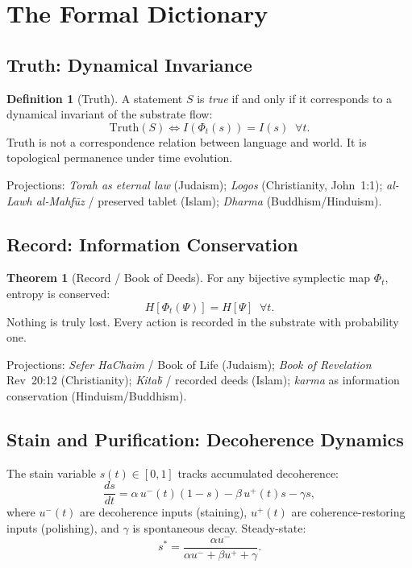 \documentclass[12pt,oneside]{book}
\theoremstyle{definition}
\newtheorem{definition}{Definition}[chapter]
\newtheorem{theorem}{Theorem}[chapter]
\begin{document}
\section{The Formal Dictionary}

\subsection{Truth: Dynamical Invariance}

\begin{definition}[Truth]
  A statement $S$ is \emph{true} if and only if it corresponds to a dynamical
  invariant of the substrate flow:
  \begin{equation}
    \mathrm{Truth}(S) \iff I(\Phi_t(s)) = I(s) \;\;\forall t.
  \end{equation}
  Truth is not a correspondence relation between language and world. It is
  topological permanence under time evolution.
\end{definition}

\noindent Projections: \textit{Torah as eternal law} (Judaism); \textit{Logos}
(Christianity, John~1:1); \textit{al-Lawh al-Mahf\={u}z} / preserved tablet
(Islam); \textit{Dharma} (Buddhism/Hinduism).

\subsection{Record: Information Conservation}

\begin{theorem}[Record / Book of Deeds]
  For any bijective symplectic map $\Phi_t$, entropy is conserved:
  \begin{equation}
    H[\Phi_t(\Psi)] = H[\Psi] \;\;\forall t.
  \end{equation}
  Nothing is truly lost. Every action is recorded in the substrate with probability one.
\end{theorem}

\noindent Projections: \textit{Sefer HaChaim} / Book of Life (Judaism);
\textit{Book of Revelation} Rev~20:12 (Christianity); \textit{Kita\={b}} /
recorded deeds (Islam); \textit{karma} as information conservation (Hinduism/Buddhism).

\subsection{Stain and Purification: Decoherence Dynamics}

The stain variable $s(t) \in [0,1]$ tracks accumulated decoherence:
\begin{equation}
  \label{eq:stain}
  \frac{ds}{dt} = \alpha\,u^-(t)(1-s) - \beta\,u^+(t)s - \gamma s,
\end{equation}
where $u^-(t)$ are decoherence inputs (staining), $u^+(t)$ are coherence-restoring
inputs (polishing), and $\gamma$ is spontaneous decay. Steady-state:
\begin{equation}
  s^* = \frac{\alpha u^-}{\alpha u^- + \beta u^+ + \gamma}.
\end{equation}
\end{document}
